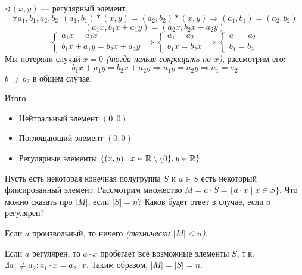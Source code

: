 \begin{solution}
    \(\sphericalangle (x, y)\) --- регулярный элемент.
    \[\forall a_1, b_1, a_2, b_2 \ \ (a_1, b_1) * (x, y) = (a_2, b_2) * (x, y) \Rightarrow (a_1, b_1) = (a_2, b_2)\]
    \[(a_1 x, b_1 x + a_1 y) = (a_2 x, b_2 x + a_2 y)\]
    \[\begin{cases}
            a_1 x = a_2x \\
            b_1 x + a_1 y = b_2 x + a_2 y
        \end{cases} \Rightarrow \begin{cases}
            a_1 = a_2 \\
            b_1 x = b_2 x
        \end{cases} \Rightarrow \begin{cases}
            a_1 = a_2 \\
            b_1 = b_2
        \end{cases}\]
    Мы потеряли случай \(x = 0\) \textit{(тогда нельзя сокращать на \(x\))}, рассмотрим его:
    \[b_1 x + a_1 y = b_2 x + a_2 y \Rightarrow a_1 y = a_2 y \Rightarrow a_1 = a_2\]
    \(b_1 \neq b_2\) в общем случае.

    Итого:
    \begin{itemize}
        \item Нейтральный элемент \((0, 0)\)
        \item Поглощающий элемент \((0, 0)\)
        \item Регулярные элементы \(\{(x, y) \mid x \in \mathbb{R} \setminus \{0\}, y \in \mathbb{R}\}\)
    \end{itemize}
\end{solution}

\begin{exercise}
    Пусть есть некоторая конечная полугруппа \(S\) и \(a \in S\) есть некоторый фиксированный элемент. Рассмотрим множество \(M = a \cdot S = \{a \cdot x \mid x \in S\}\). Что можно сказать про \(|M|\), если \(|S| = n\)? Каков будет ответ в случае, если \(a\) регулярен?
\end{exercise}
\begin{solution}
    Если \(a\) произвольный, то ничего \textit{(технически \(|M| \leq n\))}.

    Если \(a\) регулярен, то \(a \cdot x\) пробегает все возможные элементы \(S\), т.к. \(\nexists a_1 \neq a_2 : a_1 \cdot x = a_2 \cdot x\). Таким образом, \(|M| = |S| = n\).
\end{solution}

